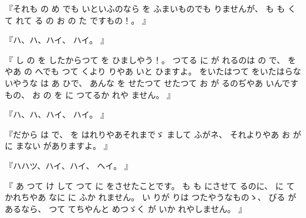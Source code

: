 『それも
の
め
でも
いといふのなら
を
ふまいものでも
りませんが、
%
も
も
く
て
れて
る
の
お
の
た
ですもの！。
』

『ハ、ハ、ハイ、
%
ハイ。
』

『
し
の
を
したからつて
を
ひましやう！。
%
つてる
に
が
れるのは
の
で、
%
を
やあ
の
へでも
つて
くより
りやあ
いと
ひますよ。
%
をいたはつて
をいたはらないやうな
は
あ
ひで、
%
あんな
を
せたつて
せたつて
お
が
るのぢやあ
いんですもの、
%
お
の
を
に
つてるか
れや
ません。
』

『ハ、ハ、ハイ、
%
ハイ。
』

『だから
は
で、
%
を
はれりやあそれまでゞ
まして
ふがネ、
%
それよりやあ
お
が
に
まない
がありますよ。
』

『ハハツ、ハイ、ハイ、
%
ヘイ。
』

『
あ
つて
け
して
つて
に
をさせたことです。
%
も
も
にさせて
るのに、
%
に
て
かれちやあ
なに
に
ふか
れません。
%
い
りが
りは
つたやうなものゝ、
%
びる
があるなら、
%
つて
てちやんと
めつゞく
が
いか
れやしません。
』

